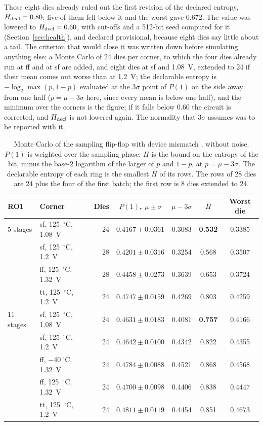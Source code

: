 Those eight dies already ruled out the first revision of the declared
entropy, $H_{\mathrm{decl}} = 0.80$: five of them fell below it and the worst gave
0.672. The value was lowered to $H_{\mathrm{decl}} = 0.60$, with cut-offs and a
512-bit seed computed for it (Section~\ref{sec:health}), and declared
provisional, because eight dies say little about a tail. The criterion
that would close it was written down before simulating anything else: a
Monte Carlo of 24 dies per corner, to which the four dies already run at
ff and at sf are added, and eight dies at sf and 1.08~V, extended to 24
if their mean comes out worse than at 1.2~V; the declarable entropy is
$-\log_2\max(p, 1-p)$ evaluated at the $3\sigma$ point of $P(1)$ on the
side away from one half ($p = \mu - 3\sigma$ here, since every mean is
below one half), and the minimum over the corners is the figure; if it
falls below 0.60 the circuit is corrected, and $H_{\mathrm{decl}}$ is not lowered
again. The normality that $3\sigma$ assumes was to be reported with it.

\begin{table}[htbp]
\centering
\caption{Monte Carlo of the sampling flip-flop with device mismatch
\simu{}, without noise. $P(1)$ is weighted over the sampling phase; $H$ is
the bound on the entropy of the bit, minus the base-2 logarithm of the
larger of $p$ and $1-p$, at $p = \mu - 3\sigma$. The declarable entropy
of each ring is the smallest $H$ of its rows. The rows of 28 dies are 24
plus the four of the first batch; the first row is 8 dies extended to
24.}
\label{tab:ff_mc}
\small
\begin{tabular}{@{}llrcccc@{}}
\toprule
RO1 & Corner & Dies & $P(1)$, $\mu \pm \sigma$ & $\mu - 3\sigma$ & $H$ & Worst die \\
\midrule
5 stages  & sf, 125~$^\circ$C, 1.08~V & 24 & $0.4167 \pm 0.0361$ & 0.3083 & \textbf{0.532} & 0.3385 \\
          & sf, 125~$^\circ$C, 1.2~V  & 28 & $0.4201 \pm 0.0316$ & 0.3254 & 0.568 & 0.3507 \\
          & ff, 125~$^\circ$C, 1.32~V & 28 & $0.4458 \pm 0.0273$ & 0.3639 & 0.653 & 0.3724 \\
          & tt, 125~$^\circ$C, 1.2~V  & 24 & $0.4747 \pm 0.0159$ & 0.4269 & 0.803 & 0.4259 \\
\midrule
11 stages & sf, 125~$^\circ$C, 1.08~V & 24 & $0.4631 \pm 0.0183$ & 0.4081 & \textbf{0.757} & 0.4166 \\
          & sf, 125~$^\circ$C, 1.2~V  & 24 & $0.4642 \pm 0.0100$ & 0.4342 & 0.822 & 0.4355 \\
          & ff, $-40~^\circ$C, 1.32~V & 24 & $0.4784 \pm 0.0088$ & 0.4521 & 0.868 & 0.4568 \\
          & ff, 125~$^\circ$C, 1.32~V & 24 & $0.4700 \pm 0.0098$ & 0.4406 & 0.838 & 0.4447 \\
          & tt, 125~$^\circ$C, 1.2~V  & 24 & $0.4811 \pm 0.0119$ & 0.4454 & 0.851 & 0.4673 \\
\bottomrule
\end{tabular}
\end{table}

